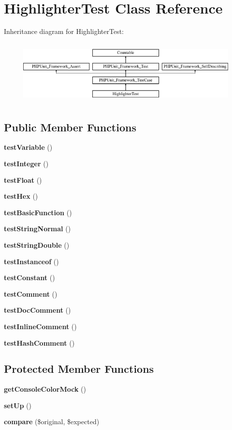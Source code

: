 \section{Highlighter\+Test Class Reference}
\label{class_jakub_onderka_1_1_php_console_highlighter_1_1_highlighter_test}
Inheritance diagram for Highlighter\+Test\+:\begin{figure}[H]
\begin{center}
\leavevmode
\includegraphics[height=3.303835cm]{class_jakub_onderka_1_1_php_console_highlighter_1_1_highlighter_test}
\end{center}
\end{figure}
\subsection*{Public Member Functions}
\begin{DoxyCompactItemize}
\item 
{\bf test\+Variable} ()
\item 
{\bf test\+Integer} ()
\item 
{\bf test\+Float} ()
\item 
{\bf test\+Hex} ()
\item 
{\bf test\+Basic\+Function} ()
\item 
{\bf test\+String\+Normal} ()
\item 
{\bf test\+String\+Double} ()
\item 
{\bf test\+Instanceof} ()
\item 
{\bf test\+Constant} ()
\item 
{\bf test\+Comment} ()
\item 
{\bf test\+Doc\+Comment} ()
\item 
{\bf test\+Inline\+Comment} ()
\item 
{\bf test\+Hash\+Comment} ()
\end{DoxyCompactItemize}
\subsection*{Protected Member Functions}
\begin{DoxyCompactItemize}
\item 
{\bf get\+Console\+Color\+Mock} ()
\item 
{\bf set\+Up} ()
\item 
{\bf compare} (\$original, \$expected)
\end{DoxyCompactItemize}
